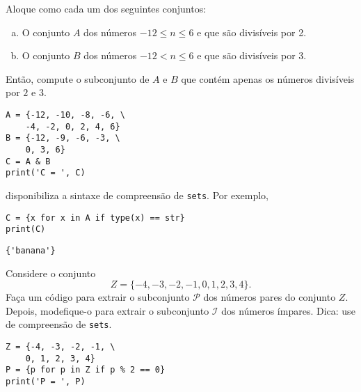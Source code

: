 \begin{exer}
  Aloque como {\PYTHONset} cada um dos seguintes conjuntos:
  \begin{enumerate}[a)]
    \item O conjunto $A$ dos números $-12 \leq n \leq 6$ e que são divisíveis por 2.
    \item O conjunto $B$ dos números $-12 < n \leq 6$ e que são divisíveis por 3.
  \end{enumerate}
  Então, compute o subconjunto de $A$ e $B$ que contém apenas os números divisíveis por $2$ e $3$.
\end{exer}
\begin{resp}
  
\begin{lstlisting}
A = {-12, -10, -8, -6, \
    -4, -2, 0, 2, 4, 6}
B = {-12, -9, -6, -3, \
    0, 3, 6}
C = A & B
print('C = ', C)
\end{lstlisting}

\end{resp}

\begin{obs}\label{obs:compreensão_de_conjuntos}
  {\python} disponibiliza a sintaxe de compreensão de \texttt{sets}. Por exemplo,

\begin{lstlisting}
C = {x for x in A if type(x) == str}
print(C)
\end{lstlisting}

\begin{verbatim}
{'banana'}
\end{verbatim}

\end{obs}

\begin{exer}
  Considere o conjunto
  \begin{equation}
    Z = \{-4, -3, -2, -1, 0, 1, 2, 3, 4\}.
  \end{equation}
  Faça um código {\python} para extrair o subconjunto $\mathcal{P}$ dos números pares do conjunto $Z$. Depois, modefique-o para extrair o subconjunto $\mathcal{I}$ dos números ímpares. Dica: use de compreensão de \texttt{sets}.
\end{exer}
\begin{resp}

\begin{lstlisting}
Z = {-4, -3, -2, -1, \
    0, 1, 2, 3, 4}
P = {p for p in Z if p % 2 == 0}
print('P = ', P)
\end{lstlisting}

\end{resp}

